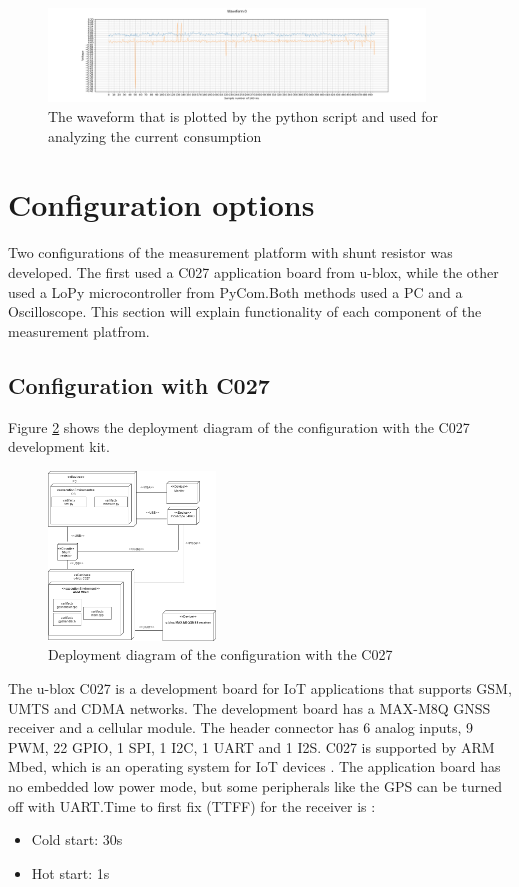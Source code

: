 \begin{figure}[H]
\centering
\includegraphics[height=2.5cm]{Project_Report/Images/pythonwaveform.png}
\caption{The waveform that is plotted by the python script and used for analyzing the current consumption}
\label{fig:pythonwaveform}
\end{figure}
 

\section{Configuration options}
 Two configurations of the measurement platform with shunt resistor was developed. The first used a C027 application board from u-blox, while the other used a LoPy microcontroller from PyCom.Both methods used a PC and a Oscilloscope. This section will explain functionality of each component of the measurement platfrom.
 


\subsection{Configuration with C027}
Figure \ref{fig:deploy_C027} shows the deployment diagram of the configuration with the C027 development kit.  

\begin{figure}[H]
\centering
\includegraphics[height=4.5cm]{Project_Report/Images/C027_deploy.png}
\caption{Deployment diagram of the configuration with the C027}
\label{fig:deploy_C027}
\end{figure}
\vspace{5mm}The u-blox C027 is a development board for IoT applications that supports GSM, UMTS and CDMA networks. The development board has a MAX-M8Q GNSS receiver and a cellular module. The header connector has 6 analog inputs, 9 PWM, 22 GPIO, 1 SPI, 1 I2C, 1 UART and 1 I2S. C027 is supported by ARM Mbed, which is an operating system for IoT devices \cite{C027}. The application board has no embedded low power mode, but some peripherals like the GPS can be turned off with UART.Time to first fix (TTFF) for the receiver is \cite{MAX-M8}:
\begin{itemize}
    \item Cold start: 30s
    \item Hot  start: 1s
\end{itemize}

